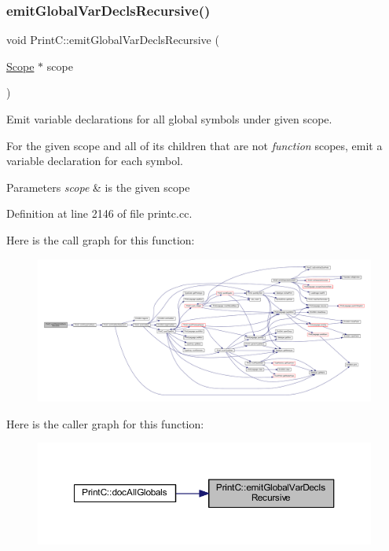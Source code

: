 \subsubsection{\texorpdfstring{emitGlobalVarDeclsRecursive()}{emitGlobalVarDeclsRecursive()}}
{\footnotesize\ttfamily void Print\+C\+::emit\+Global\+Var\+Decls\+Recursive (\begin{DoxyParamCaption}\item[{\mbox{\hyperlink{class_scope}{Scope}} $\ast$}]{scope }\end{DoxyParamCaption})\hspace{0.3cm}{\ttfamily [protected]}}



Emit variable declarations for all global symbols under given scope. 

For the given scope and all of its children that are not {\itshape function} scopes, emit a variable declaration for each symbol. 
\begin{DoxyParams}{Parameters}
{\em scope} & is the given scope \\
\hline
\end{DoxyParams}


Definition at line 2146 of file printc.\+cc.

Here is the call graph for this function\+:
\nopagebreak
\begin{figure}[H]
\begin{center}
\leavevmode
\includegraphics[width=350pt]{class_print_c_a7d048e59d4632ce57b87398378a6538c_cgraph}
\end{center}
\end{figure}
Here is the caller graph for this function\+:
\nopagebreak
\begin{figure}[H]
\begin{center}
\leavevmode
\includegraphics[width=350pt]{class_print_c_a7d048e59d4632ce57b87398378a6538c_icgraph}
\end{center}
\end{figure}
\mbox{\label{class_print_c_afd7a9bbef5548e06712bd84e130b89f8}} 
